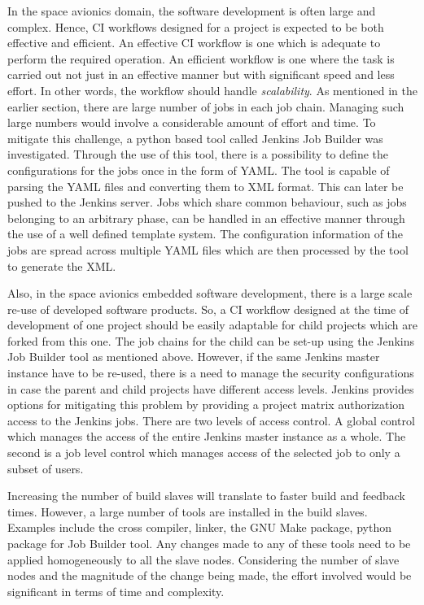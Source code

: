 \documentclass[12pt, a4paper, titlepage]{scrartcl}
\begin{document}
\par In the space avionics domain, the software development is often large and complex. Hence, CI workflows designed for a project is expected to be both effective and efficient. An effective CI workflow is one which is adequate to perform the required operation. An efficient workflow is one where the task is carried out not just in an effective manner but with significant speed and less effort. In other words, the workflow should handle \emph{scalability}. As mentioned in the earlier section, there are large number of jobs in each job chain. Managing such large numbers would involve a considerable amount of effort and time. To mitigate this challenge, a python based tool called Jenkins Job Builder was investigated. Through the use of this tool, there is a possibility to define the configurations for the jobs once in the form of YAML. The tool is capable of parsing the YAML files and converting them to XML format. This can later be pushed to the Jenkins server. Jobs which share common behaviour, such as jobs belonging to an arbitrary phase, can be handled in an effective manner through the use of a well defined template system. The configuration information of the jobs are spread across multiple YAML files which are then processed by the tool to generate the XML. 
\par Also, in the space avionics embedded software development, there is a large scale re-use of developed software products. So, a CI workflow designed at the time of development of one project should be easily adaptable for child projects which are forked from this one. The job chains for the child can be set-up using the Jenkins Job Builder tool as mentioned above. However, if the same Jenkins master instance have to be re-used, there is a need to manage the security configurations in case the parent and child projects have different access levels. Jenkins provides options for mitigating this problem by providing a project matrix authorization access to the Jenkins jobs. There are two levels of access control. A global control which manages the access of the entire Jenkins master instance as a whole. The second is a job level control which manages access of the selected job to only a subset of users. 
\par Increasing the number of build slaves will translate to faster build and feedback times. However, a large number of tools are installed in the build slaves. Examples include the cross compiler, linker, the GNU Make package, python package for Job Builder tool. Any changes made to any of these tools need to be applied homogeneously to all the slave nodes. Considering the number of slave nodes and the magnitude of the change being made, the effort involved would be significant in terms of time and complexity.   
\end{document}
